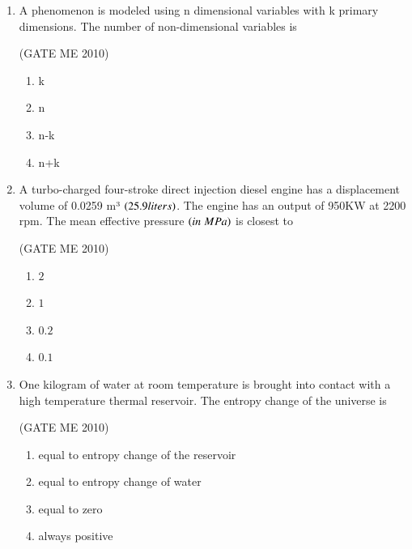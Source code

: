 \documentclass[journal,12pt,onecolumn]{IEEEtran}
\theoremstyle{remark}
\begin{document}
\begin{enumerate}
\begin{multicols}{4}
    \begin{enumerate}
        \item  $2$
        \item $3$
        \item $4$
        \item $5$
    \end{enumerate}
\end{multicols}

\item A phenomenon is modeled using n dimensional variables with k primary dimensions. The number of non-dimensional variables is

 \hfill{(GATE ME 2010)}\\

\begin{multicols}{4}
    \begin{enumerate}
        \item k
        \item n
        \item n-k
        \item n+k
    \end{enumerate}
\end{multicols}

\item A turbo-charged four-stroke direct injection diesel engine has a displacement volume of 0.0259 m³ $\left(25.9 liters\right)$. The engine has an output of 950KW at 2200 rpm. The mean effective pressure $\left(in\;MPa\right)$ is closest to

 \hfill{(GATE ME 2010)}\\
\begin{multicols}{4}
    \begin{enumerate}
        \item $2$
        \item $1$
        \item $0.2$
        \item $0.1$
    \end{enumerate}
\end{multicols}


\item One kilogram of water at room temperature is brought into contact with a high temperature thermal reservoir. The entropy change of the universe is

 \hfill{(GATE ME 2010)}\\
 
    \begin{enumerate}
        \item equal to entropy change of the reservoir
\item equal to entropy change of water
\item equal to zero
\item always positive
    \end{enumerate}
 


\end{enumerate}
\end{document}
